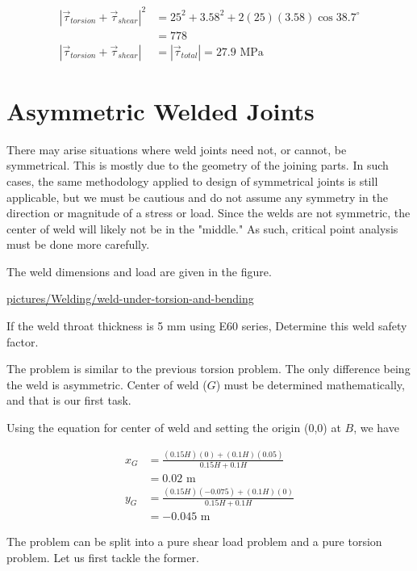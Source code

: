 \documentclass[a4paper,openany,12pt]{book}
\begin{document}
{{$$\begin{aligned}
    \left| \vec{\tau}_{torsion} + \vec{\tau}_{shear} \right|^2 &= 25^2 + 3.58^2 + 2(25)(3.58) \cos 38.7^{\circ} \\
                                                               &= 778 \\
    \left| \vec{\tau}_{torsion} + \vec{\tau}_{shear} \right| &= \left| \vec{\tau}_{total} \right| = 27.9 \text{ MPa}                                                        
  \end{aligned}$$

\section{Asymmetric Welded Joints}
\label{asymmetric-welded-joints}
There may arise situations where weld joints need not, or cannot, be
symmetrical. This is mostly due to the geometry of the joining parts. In
such cases, the same methodology applied to design of symmetrical joints
is still applicable, but we must be cautious and do not assume any
symmetry in the direction or magnitude of a stress or load. Since the
welds are not symmetric, the center of weld will likely not be in the
"middle." As such, critical point analysis must be done more carefully.

The weld dimensions and load are given in the figure.

\url{pictures/Welding/weld-under-torsion-and-bending}

If the weld throat thickness is 5 mm using E60 series, Determine this
weld safety factor.

The problem is similar to the previous torsion problem. The only
difference being the weld is asymmetric. Center of weld (\(G\)) must be
determined mathematically, and that is our first task.

Using the equation for center of weld and setting the origin (0,0) at
\(B\), we have

$$\begin{aligned}
    x_G &= \frac{(0.15H)(0) + (0.1H)(0.05)}{ 0.15H + 0.1H } \\
        &= 0.02 \text{ m} \\
    y_G &= \frac{(0.15H)(-0.075) + (0.1H)(0)}{ 0.15H + 0.1H } \\
        &= -0.045 \text{ m} 
  \end{aligned}$$

The problem can be split into a pure shear load problem and a pure
torsion problem. Let us first tackle the former.

}}
\end{document}
